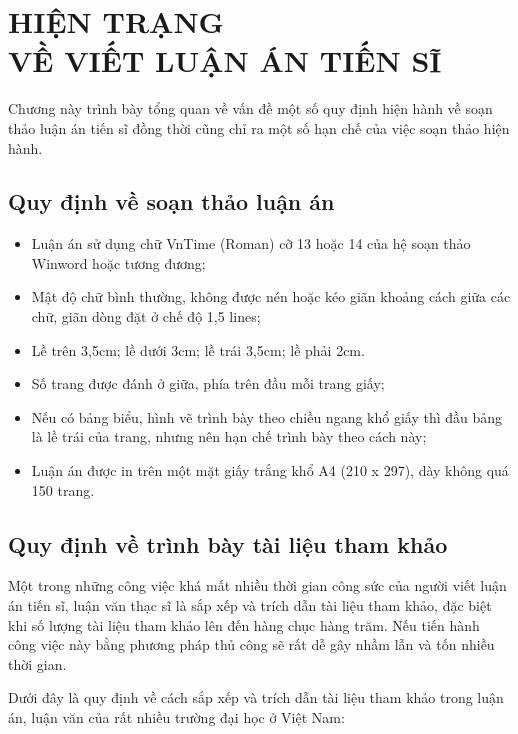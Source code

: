 \chapter[HIỆN TRẠNG VỀ VIẾT LUẬN ÁN TIẾN SĨ]{HIỆN TRẠNG \\VỀ VIẾT LUẬN ÁN TIẾN SĨ} \label{chtongquan}%

Chương này trình bày tổng quan về vấn đề một số quy định hiện hành về soạn thảo luận án tiến sĩ đồng thời cũng chỉ ra một số hạn chế của việc soạn thảo hiện hành.

\section{\bf Quy định về soạn thảo luận án}
\begin{itemize}
	\item Luận án sử dụng chữ VnTime (Roman) cỡ 13 hoặc 14 của hệ soạn thảo Winword hoặc tương đương;
	\item Mật độ chữ bình thường, không được nén hoặc kéo giãn khoảng cách giữa các chữ, giãn dòng đặt ở chế độ 1,5 lines;
	\item Lề trên 3,5cm; lề dưới 3cm; lề trái 3,5cm; lề phải 2cm.
	\item Số trang được đánh ở giữa, phía trên đầu mỗi trang giấy;
	\item Nếu có bảng biểu, hình vẽ trình bày theo chiều ngang khổ giấy thì đầu bảng là lề trái của trang, nhưng nên hạn chế trình bày theo cách này;
	\item Luận án được in trên một mặt giấy trắng khổ A4 (210 x 297), dày không quá 150 trang.
\end{itemize}
   
\section{Quy định về trình bày tài liệu tham khảo}	

Một trong những công việc khá mất nhiều thời gian công sức của người viết luận án tiến sĩ, luận văn thạc sĩ là sắp xếp và trích dẫn tài liệu tham khảo, đặc biệt khi số lượng tài liệu tham khảo lên đến hàng chục hàng trăm. Nếu tiến hành công việc này bằng phương pháp thủ công sẽ rất dễ gây nhầm lẫn và tốn nhiều thời gian.

Dưới đây là quy định về cách sắp xếp và trích dẫn tài liệu tham khảo trong luận án, luận văn của rất nhiều trường đại học ở Việt Nam:

